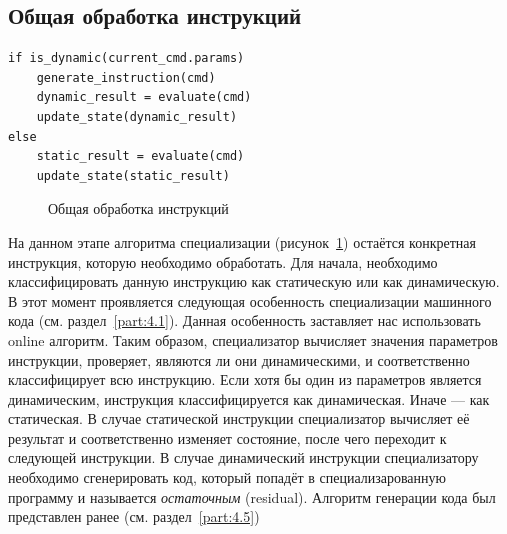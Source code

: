 \subsection{Общая обработка инструкций}
\newsavebox\boxminusone
\begin{lrbox}{\boxminusone}
\begin{lstlisting}[xleftmargin = 20pt]
if is_dynamic(current_cmd.params)
    generate_instruction(cmd)
    dynamic_result = evaluate(cmd)
    update_state(dynamic_result)
else
    static_result = evaluate(cmd)
    update_state(static_result)
\end{lstlisting}
\end{lrbox}
\begin{figure}[!t]
\centering
\subfloat{\usebox\boxminusone}
\caption{Общая обработка инструкций\label{fig:handle}}
\end{figure}
На данном этапе алгоритма специализации (рисунок~\ref{fig:handle}) остаётся конкретная инструкция, которую необходимо обработать. Для начала, необходимо классифицировать данную инструкцию как статическую или как динамическую.
В этот момент проявляется следующая особенность специализации машинного кода (см. раздел~\ref{part:4.1}).
Данная особенность заставляет нас использовать online алгоритм. Таким образом, специализатор вычисляет значения параметров инструкции, проверяет, являются ли они динамическими, и соответственно классифицирует всю инструкцию. Если хотя бы один из параметров является динамическим, инструкция классифицируется как динамическая. Иначе --- как статическая.
В случае статической инструкции специализатор вычисляет её результат и соответственно изменяет состояние, после чего переходит к следующей инструкции.
В случае динамический инструкции специализатору необходимо сгенерировать код, который попадёт в специализарованную программу и называется
\emph{остаточным} (residual).
Алгоритм генерации кода был представлен ранее (см. раздел~\ref{part:4.5})

